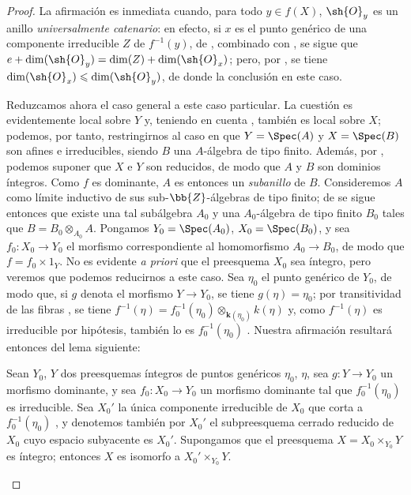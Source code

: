 \begin{proof}
La afirmación es inmediata cuando, para todo $y\in f(X)$, $\sh{O}_y$ es un anillo \emph{universalmente catenario}: en efecto, si $x$ es el punto genérico de una componente irreducible $Z$ de $f^{-1}(y)$, de , combinado con , se sigue que $e+\dim(\sh{O}_y)=\dim(Z)+\dim(\sh{O}_x)$; pero, por , se tiene $\dim(\sh{O}_x)\leq\dim(\sh{O}_y)$, de donde la conclusión en este caso.

Reduzcamos ahora el caso general a este caso particular.
La cuestión es evidentemente local sobre $Y$ y, teniendo en cuenta , también es local sobre $X$; podemos, por tanto, restringirnos al caso en que $Y=\Spec(A)$ y $X=\Spec(B)$ son afines e irreducibles, siendo $B$ una $A$-álgebra de tipo finito.
Además, por , podemos suponer que $X$ e $Y$ son reducidos, de modo que $A$ y $B$ son dominios íntegros.
Como $f$ es dominante, $A$ es entonces un \emph{subanillo} de $B$.
Consideremos $A$ como límite inductivo de sus sub-$\bb{Z}$-álgebras de tipo finito; de  se sigue entonces que existe una tal subálgebra $A_0$ y una $A_0$-álgebra de tipo finito $B_0$ tales que $B=B_0\otimes_{A_0}A$.
Pongamos $Y_0=\Spec(A_0)$, $X_0=\Spec(B_0)$, y sea $f_0:X_0\to Y_0$ el morfismo correspondiente al homomorfismo $A_0\to B_0$, de modo que $f=f_0\times 1_Y$.
No es evidente \emph{a priori} que el preesquema $X_0$ sea íntegro, pero veremos que podemos reducirnos a este caso.
Sea $\eta_0$ el punto genérico de $Y_0$, de modo que, si $g$ denota el morfismo $Y\to Y_0$, se tiene $g(\eta)=\eta_0$; por transitividad de las fibras , se tiene $f^{-1}(\eta)=f_0^{-1}(\eta_0)\otimes_{\mathbf k(\eta_0)}k(\eta)$ y, como $f^{-1}(\eta)$ es irreducible por hipótesis, también lo es $f_0^{-1}(\eta_0)$ .
Nuestra afirmación resultará entonces del lema siguiente:

\begin{lemma}[13.1.2]
\label{IV.13.1.2}
Sean $Y_0$, $Y$ dos preesquemas íntegros de puntos genéricos $\eta_0$, $\eta$, sea $g:Y\to Y_0$ un morfismo dominante, y sea $f_0:X_0\to Y_0$ un morfismo dominante tal que $f_0^{-1}(\eta_0)$ es irreducible.
Sea $X_0'$ la única componente irreducible de $X_0$ que corta a $f_0^{-1}(\eta_0)$ , y denotemos también por $X_0'$ el subpreesquema cerrado reducido de $X_0$ cuyo espacio subyacente es $X_0'$.
Supongamos que el preesquema $X=X_0\times_{Y_0}Y$ es íntegro; entonces $X$ es isomorfo a $X_0'\times_{Y_0}Y$.
\end{lemma}


\end{proof}
